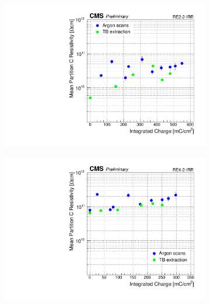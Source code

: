 	\begin{figure}[H]
    	\begin{subfigure}{0.5\linewidth}
			\centering
    		\includegraphics[width = \linewidth]{fig/chapt5/Extract-Res_vs_time_RE2-2-IRR.pdf}
        	\caption{\label{fig:Resistivity-extract:A}}
    	\end{subfigure}
    	\begin{subfigure}{0.5\linewidth}
			\centering
    		\includegraphics[width = \linewidth]{fig/chapt5/Extract-Res_vs_time_RE4-2-IRR.pdf}
        	\caption{\label{fig:Resistivity-extract:B}}
    	\end{subfigure}
    	\begin{subfigure}{0.5\linewidth}
			\centering

\end{subfigure}
\end{figure}
